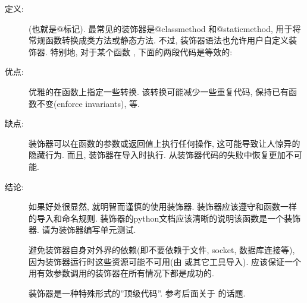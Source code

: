 \documentclass[a4paper,10pt,english]{sphinxmanual}
\begin{document}
\begin{description}
\item[{定义:}] \leavevmode
{} (也就是@标记). 最常见的装饰器是@classmethod 和@staticmethod, 用于将常规函数转换成类方法或静态方法. 不过, 装饰器语法也允许用户自定义装饰器. 特别地, 对于某个函数  , 下面的两段代码是等效的:

%
\begin{sphinxVerbatim}[commandchars=\\\{\}]
 
    
\end{sphinxVerbatim}

%
\begin{sphinxVerbatim}[commandchars=\\\{\}]
 
     
      
\end{sphinxVerbatim}

\item[{优点:}] \leavevmode
优雅的在函数上指定一些转换. 该转换可能减少一些重复代码, 保持已有函数不变(enforce invariants), 等.

\item[{缺点:}] \leavevmode
装饰器可以在函数的参数或返回值上执行任何操作, 这可能导致让人惊异的隐藏行为. 而且, 装饰器在导入时执行. 从装饰器代码的失败中恢复更加不可能.

\item[{结论:}] \leavevmode
如果好处很显然, 就明智而谨慎的使用装饰器. 装饰器应该遵守和函数一样的导入和命名规则. 装饰器的python文档应该清晰的说明该函数是一个装饰器. 请为装饰器编写单元测试.

避免装饰器自身对外界的依赖(即不要依赖于文件, socket, 数据库连接等), 因为装饰器运行时这些资源可能不可用(由  或其它工具导入). 应该保证一个用有效参数调用的装饰器在所有情况下都是成功的.

装饰器是一种特殊形式的”顶级代码”. 参考后面关于 {\hyperref[\detokenize{python_style_rules:main}]{}} 的话题.

\end{description}
\end{document}
